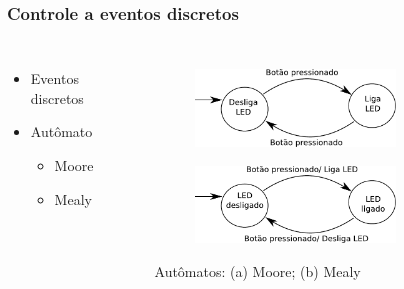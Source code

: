 
\begin{frame}
\frametitle{Controle a eventos discretos}
\begin{columns}
	\begin{itemize}
	\item Eventos discretos
	\item Autômato
		\begin{itemize}
		\item Moore
		\item Mealy
		\end{itemize}
	\end{itemize}
	
	\begin{figure}[h]
     \centering
     \captionsetup{width=0.85\textwidth,font=footnotesize,textfont=bf}
     \begin{subfigure}[b]{\textwidth}
 	\centering
         \includegraphics[width=0.85\textwidth,height=\textheight,keepaspectratio]{Figuras/moore.pdf}
         \caption{\centering \label{fig:moore}}
     \end{subfigure}
     
     \begin{subfigure}[b]{\textwidth}
 	\centering
         \includegraphics[width=0.85\textwidth,height=5\textheight,keepaspectratio]{Figuras/mealy.pdf}
         \caption{\centering \label{fig:mealy}}
     \end{subfigure}
	\caption{Autômatos: (a) Moore; (b) Mealy}
 \end{figure}
	
\end{columns}
\end{frame}


